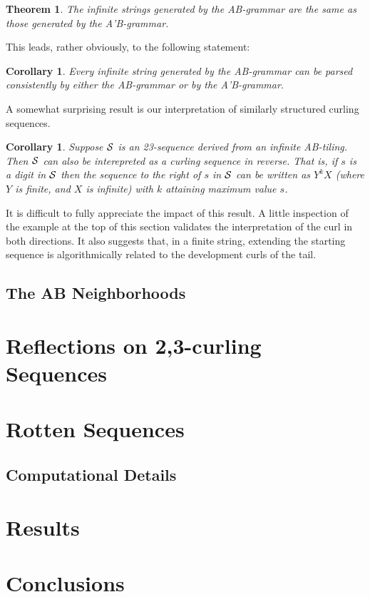\documentclass[11pt]{article}
\newcounter{thm}
\newtheorem{theorem}[thm]{Theorem}
\newtheorem{corollary}[thm]{Corollary}
\def\ni{\noindent}
\begin{document}
\begin{theorem}
The infinite strings generated by the AB-grammar are the same as those generated by the A'B-grammar.
\end{theorem}
\ni This leads, rather obviously, to the following statement:
\begin{corollary}
Every infinite string generated by the AB-grammar can be parsed consistently
by either the AB-grammar or by the A'B-grammar.
\end{corollary}

A somewhat surprising result is our interpretation of similarly structured
curling sequences.
\begin{corollary}
Suppose $\mathcal{S}$ is an 23-sequence derived from an infinite AB-tiling. Then
$\mathcal{S}$ can also be interepreted as a curling sequence in reverse. 
That is, if $s$ is a digit
in $\mathcal{S}$ then the sequence to the right of $s$ in $\mathcal{S}$ can be written as
$Y^kX$ (where $Y$ is finite, and $X$ is infinite) with $k$ attaining maximum
value $s$.
\end{corollary}
\ni It is difficult to fully appreciate the impact of this result.  A little
inspection of the example at the top of this section validates the
interpretation of the curl in both directions.  It also suggests that, in a
finite string, extending the starting sequence is algorithmically related to
the development curls of the tail.

\subsection{The AB Neighborhoods}

\section{Reflections on 2,3-curling Sequences}\label{sect:reflections}

\section{Rotten Sequences}\label{sect:rotten}
\subsection{Computational Details}
\section{Results}\label{sect:results}
\section{Conclusions}\label{sect:conclusions}
\end{document}
